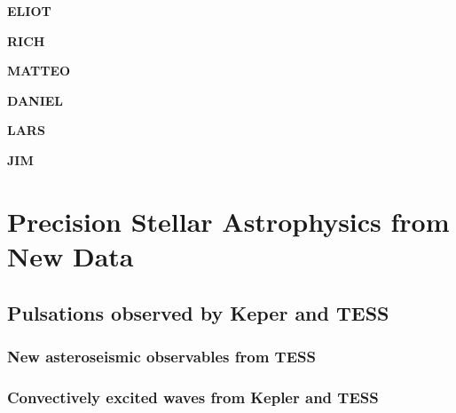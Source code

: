 


{\color{blue}
{\bf {\Large ELIOT}}
}

{\color{brown}
{\bf {\Large RICH}}
}

{\color{red}
{\bf {\Large MATTEO}}
}

{\color{purple}
{\bf {\Large DANIEL}}
}

{\color{green}
{\bf {\Large LARS}}
}

{\color{orange}
{\bf {\Large JIM}}
}


\section{Precision Stellar Astrophysics from New Data}



{\color{blue}
\subsection{Pulsations observed by Keper and TESS}
\subsubsection{New asteroseismic observables from TESS}


\subsubsection{Convectively excited waves from Kepler and TESS}


}
